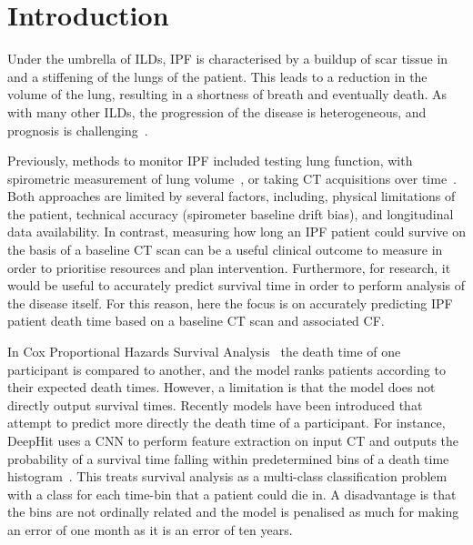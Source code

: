     \section{Introduction} \label{sec:deep_learning_for_ct_based_survival_analysis_of_idiopathic_pulmonary_fibrosis_patients_appendix_introduction}
        Under the umbrella of \glspl{ILD}, \gls{IPF} is  characterised by a buildup of scar tissue in and a stiffening of the lungs of the patient. This leads to a reduction in the volume of the lung, resulting in a shortness of breath and eventually death. As with many other \glspl{ILD}, the progression of the disease is heterogeneous, and prognosis is challenging~\parencite{King2011IdiopathicFibrosis}.
        
        Previously, methods to monitor \gls{IPF} included testing lung function, with spirometric measurement of lung volume~\parencite{Watters1986AFibrosis}, or taking \gls{CT} acquisitions over time~\parencite{Lynch2018DiagnosticPaper}. Both approaches are limited by several factors, including, physical limitations of the patient, technical accuracy (spirometer baseline drift bias), and  longitudinal data availability. In contrast, measuring how long an \gls{IPF} patient could survive on the basis of a baseline \gls{CT} scan can be a useful clinical outcome to measure in order to prioritise resources and plan intervention. Furthermore, for research, it would be useful to accurately predict survival time in order to perform analysis of the disease itself. For this reason, here the focus is on accurately predicting \gls{IPF} patient death time based on a baseline \gls{CT} scan and associated \gls{CF}.
    
        In Cox Proportional Hazards Survival Analysis~\parencite{Cox1972RegressionLife-Tables} the death time of one participant is compared to another, and the model ranks patients according to their expected death times. However, a limitation is that the model does not directly output survival times. Recently models have been introduced that attempt to predict more directly the death time of a participant. For instance, DeepHit uses a \gls{CNN} to perform feature extraction on input \gls{CT} and outputs the probability of a survival time falling within predetermined bins of a death time histogram~\parencite{Lee2018DeepHit:Risks}. This treats survival analysis as a multi-class classification problem with a class for each time-bin that a patient could die in. A disadvantage is that the bins are not ordinally related and the model is penalised as much for making an error of one month as it is an error of ten years.
    
